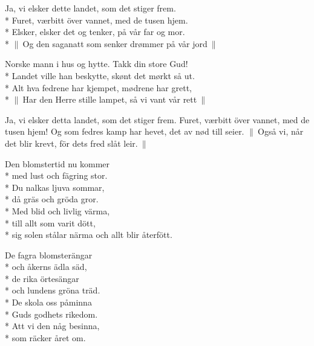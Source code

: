 \begin{SongText}[Ja vi elsker]
    \begin{Verse}
        Ja, vi elsker dette landet, som det stiger frem.\\*%
        Furet, værbitt över vannet, med de tusen hjem.\\*%
        Elsker, elsker det og tenker, på vår far og mor.\\*%
        $\|\:$Og den saganatt som senker drømmer på vår jord$\:\|$
    \end{Verse}
    \begin{Verse}
        Norske mann i hus og hytte. Takk din store Gud!\\*%
        Landet ville han beskytte, skønt det mørkt så ut.\\*%
        Alt hva fedrene har kjempet, mødrene har grett,\\*%
        $\|\:$Har den Herre stille lampet, så vi vant vår rett$\:\|$
    \end{Verse}
    \begin{Verse}
        Ja, vi elsker detta landet, som det stiger frem.
        Furet, værbitt över vannet, med de tusen hjem!
        Og som fedres kamp har hevet, det av nød till seier.
        $\|\:$Også vi, når det blir krevt, för dets fred slåt leir.$\:\|$
    \end{Verse}
\end{SongText}

\begin{SongText}
    \begin{Verse}
        Den blomstertid nu kommer\\*%
        med lust och fägring stor.\\*%
        Du nalkas ljuva sommar,\\*%
        då gräs och gröda gror.\\*%
        Med blid och livlig värma,\\*%
        till allt som varit dött,\\*%
        sig solen stålar närma och allt blir återfött.
    \end{Verse}
    \begin{Verse}
        De fagra blomsterängar\\*%
        och åkerns ädla säd,\\*%
        de rika örtesängar\\*%
        och lundens gröna träd.\\*%
        De skola oss påminna\\*%
        Guds godhets rikedom.\\*%
        Att vi den någ besinna,\\*%
        som räcker året om.
    \end{Verse}
\end{SongText}

\newpage